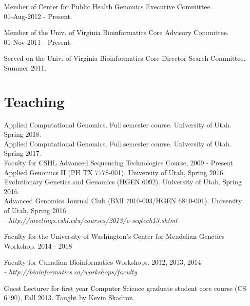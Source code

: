 \documentclass[margin,line]{cv}
\begin{document}
\begin{resume}
    Member of Center for Public Health Genomics Executive Committee.\\
    01-Aug-2012 - Present.

    \vspace{-2mm}
    Member of the Univ. of Virginia Bioinformatics Core Advisory Committee.\\
    01-Nov-2011 - Present.

    \vspace{-2mm}
    Served on the Univ. of Virginia Bioinformatics Core Director Search Committee. \\
    Summer 2011.



    \section{\mysidestyle Teaching}
    Applied Computational Genomics. Full semester course. University of Utah. Spring 2018. \\
    Applied Computational Genomics. Full semester course. University of Utah. Spring 2017. \\
    Faculty for CSHL Advanced Sequencing Technologies Course, 2009 - Present\\
    Applied Genomics II (PH TX 7778-001). University of Utah, Spring 2016. \\
    Evolutionary Genetics and Genomics (HGEN 6092). University of Utah, Spring 2016. \\
    Advanced Genomics Journal Club (BMI 7010-003/HGEN 6810-001). University of Utah, Spring 2016. \\
    \emph{- http://meetings.cshl.edu/courses/2013/c-seqtech13.shtml}

    \vspace{-2mm}
    Faculty for the University of Washington's Center for Mendelian Genetics Workshop. 2014 - 2018

    \vspace{-2mm}
    Faculty for Canadian Bioinformatics Workshops. 2012, 2013, 2014 \\
    \emph{- http://bioinformatics.ca/workshops/faculty}

    \vspace{-2mm}
    Guest Lecturer for first year Computer Science graduate student core course (CS 6190), Fall 2013. Taught by Kevin Skadron.


\end{resume}
\end{document}
